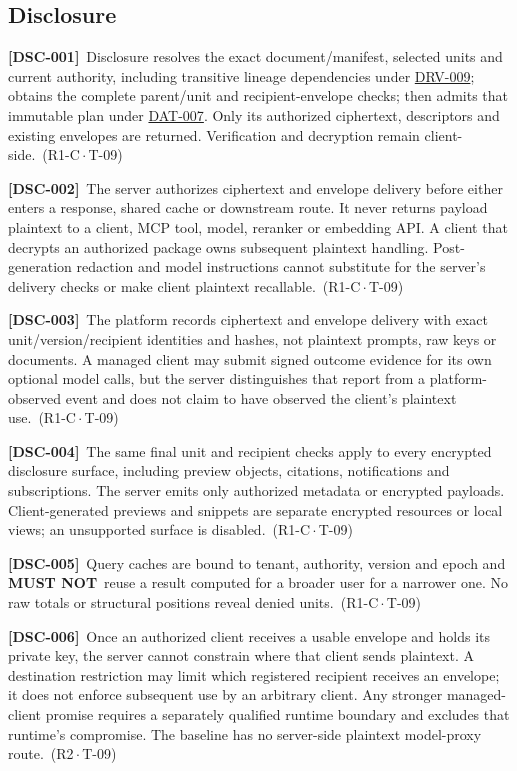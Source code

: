 \documentclass[11pt,a4paper]{article}
\newcommand{\mustnot}{\textbf{MUST NOT}}
\newcommand{\rr}[1]{\hyperlink{req:#1}{#1}}
\newcommand{\reqtag}[2]{{\footnotesize\color{accent}(#1\,$\cdot$\,#2)}}
\newcommand{\req}[4]{\par\noindent\hypertarget{req:#1}{\textbf{[#1]}}\ #4\ \reqtag{#2}{#3}\par}
\begin{document}
\subsection{Disclosure}
\req{DSC-001}{R1-C}{T-09}{Disclosure resolves the exact document/manifest, selected units and current authority, including transitive lineage dependencies under \rr{DRV-009}; obtains the complete parent/unit and recipient-envelope checks; then admits that immutable plan under \rr{DAT-007}. Only its authorized ciphertext, descriptors and existing envelopes are returned. Verification and decryption remain client-side.}
\req{DSC-002}{R1-C}{T-09}{The server authorizes ciphertext and envelope delivery before either enters a response, shared cache or downstream route. It never returns payload plaintext to a client, MCP tool, model, reranker or embedding API. A client that decrypts an authorized package owns subsequent plaintext handling. Post-generation redaction and model instructions cannot substitute for the server's delivery checks or make client plaintext recallable.}
\req{DSC-003}{R1-C}{T-09}{The platform records ciphertext and envelope delivery with exact unit/version/recipient identities and hashes, not plaintext prompts, raw keys or documents. A managed client may submit signed outcome evidence for its own optional model calls, but the server distinguishes that report from a platform-observed event and does not claim to have observed the client's plaintext use.}
\req{DSC-004}{R1-C}{T-09}{The same final unit and recipient checks apply to every encrypted disclosure surface, including preview objects, citations, notifications and subscriptions. The server emits only authorized metadata or encrypted payloads. Client-generated previews and snippets are separate encrypted resources or local views; an unsupported surface is disabled.}
\req{DSC-005}{R1-C}{T-09}{Query caches are bound to tenant, authority, version and epoch and \mustnot\ reuse a result computed for a broader user for a narrower one. No raw totals or structural positions reveal denied units.}
\req{DSC-006}{R2}{T-09}{Once an authorized client receives a usable envelope and holds its private key, the server cannot constrain where that client sends plaintext. A destination restriction may limit which registered recipient receives an envelope; it does not enforce subsequent use by an arbitrary client. Any stronger managed-client promise requires a separately qualified runtime boundary and excludes that runtime's compromise. The baseline has no server-side plaintext model-proxy route.}
\end{document}
